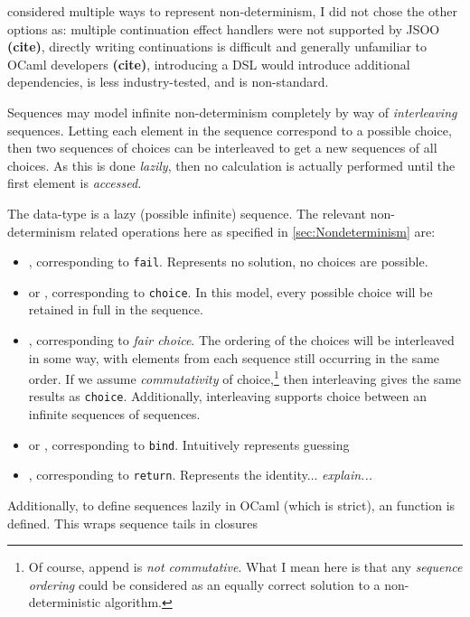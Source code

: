  considered multiple ways to represent non-determinism, I did not chose the other options as: multiple continuation effect handlers were not supported by JSOO \textbf{(cite)}, directly writing continuations is difficult and generally unfamiliar to OCaml developers \textbf{(cite)}, introducing a DSL \cite{NondetDSL} would introduce additional dependencies, is less industry-tested, and is non-standard.

Sequences may model infinite non-determinism completely by way of \textit{interleaving} sequences. Letting each element in the sequence correspond to a possible choice, then two sequences of choices can be interleaved to get a new sequences of all choices. As this is done \textit{lazily}, then no calculation is actually performed until the first element is \textit{accessed.}

The  data-type is a lazy (possible infinite) sequence. The relevant non-determinism related operations here as specified in \cref{sec:Nondeterminism} are:
\begin{itemize}
\item {}, corresponding to \texttt{fail}. Represents no solution, no choices are possible.
\item {} or \code{(++)}, corresponding to \texttt{choice}. In this model, every possible choice will be retained in full in the sequence.
\item {}, corresponding to \textit{fair choice}. The ordering of the choices will be interleaved in some way, with elements from each sequence still occurring in the same order. If we assume \textit{commutativity} of choice,\footnote{Of course, append is \textit{not commutative}. What I mean here is that any \textit{sequence ordering} could be considered as an equally correct solution to a non-deterministic algorithm.} then interleaving gives the same results as \texttt{choice}. Additionally, interleaving supports choice between an infinite sequences of sequences.
\item {} or \code{(>>=)}, corresponding to \texttt{bind}. Intuitively represents guessing
\item {}, corresponding to \texttt{return}. Represents the identity... \textit{explain...}
\end{itemize}

Additionally, to define sequences lazily in OCaml (which is strict), an  function is defined. This wraps sequence tails in closures

